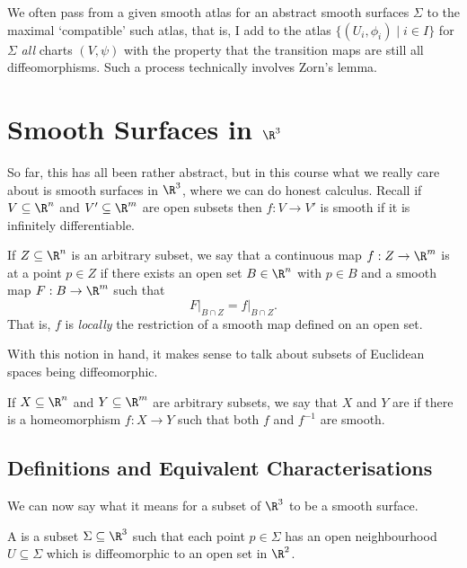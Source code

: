 \begin{remark}
    We often pass from a given smooth atlas for an abstract smooth surfaces $\Sigma$ to the maximal `compatible' such atlas, that is, I add to the atlas $\{(U_i, \phi_i) \mid i \in I\}$ for $\Sigma$ \emph{all} charts $(V, \psi)$ with the property that the transition maps are  still all diffeomorphisms. Such a process technically involves Zorn's lemma.
\end{remark}

\section{Smooth Surfaces in $\R^3$}

So far, this has all been rather abstract, but in this course what we really care about is smooth surfaces in $\R^3$, where we can do honest calculus. Recall if $V \subseteq \R^n$ and $V' \subseteq \R^m$ are open subsets then $f: V \rightarrow V'$ is smooth if it is infinitely differentiable.

\begin{definition}
    If $Z \subseteq \R^n$ is an arbitrary subset, we say that a continuous map $f: Z \rightarrow \R^m$ is  at a point $p \in Z$ if there exists an open set $B \in \R^n$ with $p \in B$ and a smooth map $F: B \rightarrow \R^m$ such that
    $$
\left.F\right|_{B \cap Z} = \left.f\right|_{B \cap Z}.
    $$
    That is, $f$ is \emph{locally} the restriction of a smooth map defined on an open set.
\end{definition}


With this notion in hand, it makes sense to talk about subsets of Euclidean spaces being diffeomorphic.

\begin{definition}
    If $X \subseteq \R^n$ and $Y \subseteq \R^m$ are arbitrary subsets, we say that $X$ and $Y$ are  if there is a homeomorphism $f: X \rightarrow Y$ such that both $f$ and $f^{-1}$ are smooth.
\end{definition}

\subsection{Definitions and Equivalent Characterisations}

We can now say what it means for a subset of $\R^3$ to be a smooth surface.

\begin{definition}
    A  is a subset $\Sigma \subseteq \R^3$ such that each point $p \in \Sigma$ has an open neighbourhood $U \subseteq \Sigma$ which is diffeomorphic to an open set in $\R^2$.
\end{definition}

